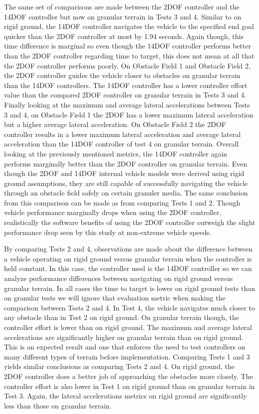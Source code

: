 \documentclass[12pt,twocolumn]{article}
\newcommand{\CHRONO}{{\sffamily{{Chrono}}}}
\begin{document}
The same set of comparisons are made between the 2DOF controller and the 14DOF controller but now on granular terrain in Tests 3 and 4. Similar to on rigid ground, the 14DOF controller navigates the {\CHRONO} vehicle to the specified end goal quicker than the 2DOF controller at most by 1.94 seconds. Again though, this time difference is marginal so even though the 14DOF controller performs better than the 2DOF controller regarding time to target, this does not mean at all that the 2DOF controller performs poorly. On Obstacle Field 1 and Obstacle Field 2, the 2DOF controller guides the vehicle closer to obstacles on granular terrain than the 14DOF controllers. The 14DOF controller has a lower controller effort value than the compared 2DOF controller on granular terrain in Tests 3 and 4. Finally looking at the maximum and average lateral accelerations between Tests 3 and 4, on Obstacle Field 1 the 2DOF has a lower maximum lateral acceleration but a higher average lateral acceleration. On Obstacle Field 2 the 2DOF controller results in a lower maximum lateral acceleration and average lateral acceleration than the 14DOF controller of test 4 on granular terrain. Overall looking at the previously mentioned metrics, the 14DOF controller again performs marginally better than the 2DOF controller on granular terrain. Even though the 2DOF and 14DOF internal vehicle models were derived using rigid ground assumptions, they are still capable of successfully navigating the {\CHRONO} vehicle through an obstacle field safely on certain granuler media. The same conclusion from this comparison can be made as from comparing Tests 1 and 2. Though vehicle performance marginally drops when using the 2DOF controller, realistically the software benefits of using the 2DOF controller outweigh the slight performance drop seen by this study at non-extreme vehicle speeds.

By comparing Tests 2 and 4, observations are made about the difference between a vehicle operating on rigid ground versus granular terrain when the controller is held constant. In this case, the controller used is the 14DOF controller so we can analyze performance differences between navigating on rigid ground versus granular terrain. In all cases the time to target is lower on rigid ground tests than on granular tests we will ignore that evaluation metric when making the comparison between Tests 2 and 4. In Test 4, the vehicle navigates much closer to any obstacle than in Test 2 on rigid ground. On granular terrain though, the controller effort is lower than on rigid ground. The maximum and average lateral accelerations are significantly higher on granular terrain than on rigid ground. This is an expected result and one that enforces the need to test controllers on many different types of terrain before implementation. Comparing Tests 1 and 3 yields similar conclusions as comparing Tests 2 and 4. On rigid ground, the 2DOF controller does a better job of approaching the obstacles more closely. The controller effort is also lower in Test 1 on rigid ground than on granular terrain in Test 3. Again, the lateral accelerations metrics on rigid ground are significantly less than those on granular terrain.
\end{document}
